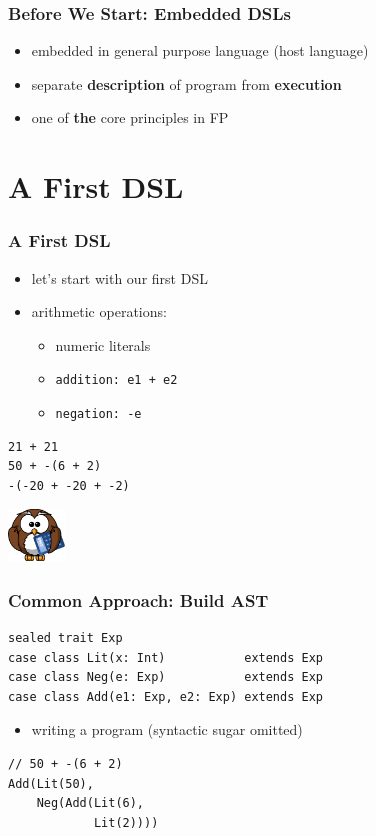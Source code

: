 \documentclass{beamer}
\begin{document}
\begin{frame}
  \frametitle{Before We Start: Embedded DSLs}
  \begin{itemize}
  \item embedded in general purpose language (host language)
  \item separate \textbf{description} of program from
    \textbf{execution}
  \item one of \textbf{the} core principles in FP
  \end{itemize}
\end{frame}

\section{A First DSL}

\begin{frame}[fragile]
  \frametitle{A First DSL}
  \begin{minipage}{0.78\linewidth}
    \begin{itemize}
    \item let's start with our first DSL
    \item arithmetic operations:
      \begin{itemize}
      \item numeric literals
      \item \texttt{addition: e1 + e2}
      \item \texttt{negation: -e}
      \end{itemize}
    \end{itemize}
\begin{verbatim}
21 + 21
50 + -(6 + 2)
-(-20 + -20 + -2)
\end{verbatim}
  \end{minipage}
  \begin{minipage}{0.18\linewidth}
    \begin{center}
      \includegraphics[width=1.5cm]{../pics/owl.png}
    \end{center}
  \end{minipage}
\end{frame}

\begin{frame}
  \frametitle{Common Approach: Build AST}
\begin{verbatim}
sealed trait Exp
case class Lit(x: Int)           extends Exp
case class Neg(e: Exp)           extends Exp
case class Add(e1: Exp, e2: Exp) extends Exp
\end{verbatim}
  \begin{itemize}
  \item writing a program (syntactic sugar omitted)
  \end{itemize}
\begin{verbatim}
// 50 + -(6 + 2)
Add(Lit(50),
    Neg(Add(Lit(6),
            Lit(2))))
\end{verbatim}
\end{frame}
\end{document}
